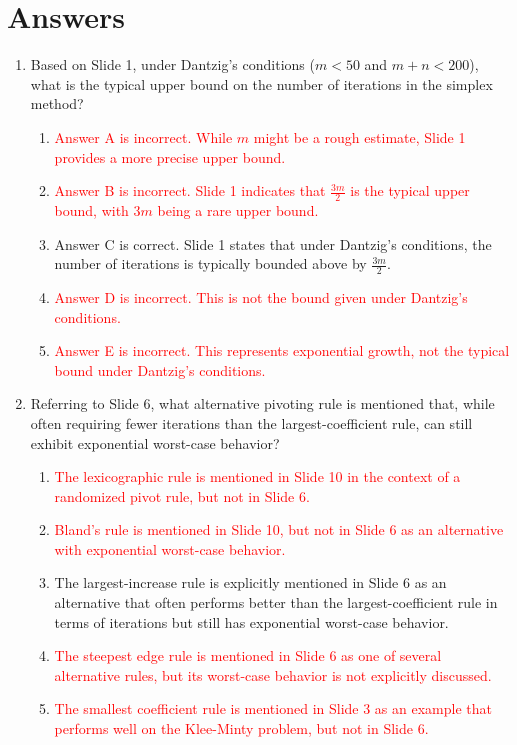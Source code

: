 \documentclass{article}%
\newcommand{\incorrect}[1]{\textcolor{red}{#1}}
\begin{document}
\section{Answers}%
\label{sec:Answers}%
\begin{enumerate}%
\item Based on Slide 1, under Dantzig's conditions ($m < 50$ and $m + n < 200$), what is the typical upper bound on the number of iterations in the simplex method?%
\begin{enumerate}%
\item \incorrect{Answer A is incorrect. While $m$ might be a rough estimate, Slide 1 provides a more precise upper bound.}%
\item \incorrect{Answer B is incorrect.  Slide 1 indicates that $\frac{3m}{2}$ is the typical upper bound, with $3m$ being a rare upper bound.}%
\item Answer C is correct. Slide 1 states that under Dantzig's conditions, the number of iterations is typically bounded above by $\frac{3m}{2}$.%
\item \incorrect{Answer D is incorrect. This is not the bound given under Dantzig's conditions.}%
\item \incorrect{Answer E is incorrect. This represents exponential growth, not the typical bound under Dantzig's conditions.}%
\end{enumerate}%
\vspace{1em}%
\item Referring to Slide 6, what alternative pivoting rule is mentioned that, while often requiring fewer iterations than the largest-coefficient rule, can still exhibit exponential worst-case behavior?%
\begin{enumerate}%
\item \incorrect{The lexicographic rule is mentioned in Slide 10 in the context of a randomized pivot rule, but not in Slide 6.}%
\item \incorrect{Bland's rule is mentioned in Slide 10, but not in Slide 6 as an alternative with exponential worst-case behavior.}%
\item The largest-increase rule is explicitly mentioned in Slide 6 as an alternative that often performs better than the largest-coefficient rule in terms of iterations but still has exponential worst-case behavior.%
\item \incorrect{The steepest edge rule is mentioned in Slide 6 as one of several alternative rules, but its worst-case behavior is not explicitly discussed.}%
\item \incorrect{The smallest coefficient rule is mentioned in Slide 3 as an example that performs well on the Klee-Minty problem, but not in Slide 6.}%

\end{enumerate}
\end{enumerate}
\end{document}
